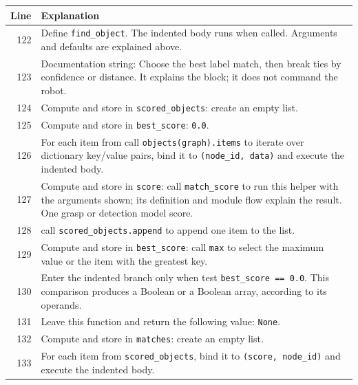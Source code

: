 \documentclass[11pt,a4paper]{book}
\begin{document}
\begin{longtable}{r p{}}

\textbf{Line} & \textbf{Explanation} \\ \hline \endhead

122 & Define \texttt{find\_object}. The indented body runs when called. Arguments and defaults are explained above. \\

123 & Documentation string: Choose the best label match, then break ties by confidence or distance. It explains the block; it does not command the robot. \\

124 & Compute and store in \texttt{scored\_objects}: create an empty list.  \\

125 & Compute and store in \texttt{best\_score}: \texttt{0.0}.  \\

126 & For each item from call \texttt{objects(graph).items} to iterate over dictionary key/value pairs, bind it to \texttt{(node\_id, data)} and execute the indented body. \\

127 & Compute and store in \texttt{score}: call \texttt{match\_score} to run this helper with the arguments shown; its definition and module flow explain the result. One grasp or detection model score. \\

128 & call \texttt{scored\_objects.append} to append one item to the list. \\

129 & Compute and store in \texttt{best\_score}: call \texttt{max} to select the maximum value or the item with the greatest key.  \\

130 & Enter the indented branch only when test \texttt{best\_score == 0.0}. This comparison produces a Boolean or a Boolean array, according to its operands. \\

131 & Leave this function and return the following value: \texttt{None}. \\

132 & Compute and store in \texttt{matches}: create an empty list.  \\

133 & For each item from \texttt{scored\_objects}, bind it to \texttt{(score, node\_id)} and execute the indented body. \\


\end{longtable}
\end{document}
